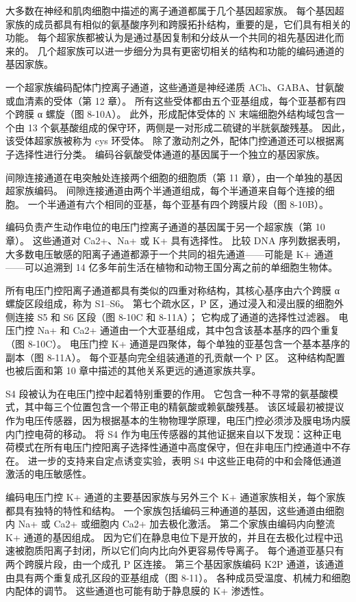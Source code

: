 大多数在神经和肌肉细胞中描述的离子通道都属于几个基因超家族。 
每个基因超家族的成员都具有相似的氨基酸序列和跨膜拓扑结构，重要的是，它们具有相关的功能。 
每个超家族都被认为是通过基因复制和分歧从一个共同的祖先基因进化而来的。 
几个超家族可以进一步细分为具有更密切相关的结构和功能的编码通道的基因家族。


一个超家族编码配体门控离子通道，这些通道是神经递质 ACh、GABA、甘氨酸或血清素的受体（第 12 章）。 
所有这些受体都由五个亚基组成，每个亚基都有四个跨膜 α 螺旋（图 8-10A）。 
此外，形成配体受体的 N 末端细胞外结构域包含一个由 13 个氨基酸组成的保守环，两侧是一对形成二硫键的半胱氨酸残基。 
因此，该受体超家族被称为 cys 环受体。 
除了激动剂之外，配体门控通道还可以根据离子选择性进行分类。 
编码谷氨酸受体通道的基因属于一个独立的基因家族。


间隙连接通道在电突触处连接两个细胞的细胞质（第 11 章），由一个单独的基因超家族编码。 
间隙连接通道由两个半通道组成，每个半通道来自每个连接的细胞。 
一个半通道有六个相同的亚基，每个亚基有四个跨膜片段（图 8-10B）。


编码负责产生动作电位的电压门控离子通道的基因属于另一个超家族（第 10 章）。 
这些通道对 Ca2+、Na+ 或 K+ 具有选择性。 
比较 DNA 序列数据表明，大多数电压敏感的阳离子通道都源于一个共同的祖先通道——可能是 K+ 通道——可以追溯到 14 亿多年前生活在植物和动物王国分离之前的单细胞生物体。


所有电压门控阳离子通道都具有类似的四重对称结构，其核心基序由六个跨膜 α 螺旋区段组成，称为 S1–S6。 
第七个疏水区，P 区，通过浸入和浸出膜的细胞外侧连接 S5 和 S6 区段（图 8-10C 和 8-11A）； 它构成了通道的选择性过滤器。 
电压门控 Na+ 和 Ca2+ 通道由一个大亚基组成，其中包含该基本基序的四个重复（图 8-10C）。 
电压门控 K+ 通道是四聚体，每个单独的亚基包含一个基本基序的副本（图 8-11A）。 
每个亚基向完全组装通道的孔贡献一个 P 区。 
这种结构配置也被后面和第 10 章中描述的其他关系更远的通道家族共享。


S4 段被认为在电压门控中起着特别重要的作用。 
它包含一种不寻常的氨基酸模式，其中每三个位置包含一个带正电的精氨酸或赖氨酸残基。 
该区域最初被提议作为电压传感器，因为根据基本的生物物理学原理，电压门控必须涉及膜电场内膜内门控电荷的移动。 
将 S4 作为电压传感器的其他证据来自以下发现：这种正电荷模式在所有电压门控阳离子选择性通道中高度保守，但在非电压门控通道中不存在。 
进一步的支持来自定点诱变实验，表明 S4 中这些正电荷的中和会降低通道激活的电压敏感性。


编码电压门控 K+ 通道的主要基因家族与另外三个 K+ 通道家族相关，每个家族都具有独特的特性和结构。 
一个家族包括编码三种通道的基因，这些通道由细胞内 Na+ 或 Ca2+ 或细胞内 Ca2+ 加去极化激活。 
第二个家族由编码内向整流 K+ 通道的基因组成。 
因为它们在静息电位下是开放的，并且在去极化过程中迅速被胞质阳离子封闭，所以它们向内比向外更容易传导离子。 
每个通道亚基只有两个跨膜片段，由一个成孔 P 区连接。 
第三个基因家族编码 K2P 通道，该通道由具有两个重复成孔区段的亚基组成（图 8-11）。 
各种成员受温度、机械力和细胞内配体的调节。 
这些通道也可能有助于静息膜的 K+ 渗透性。


